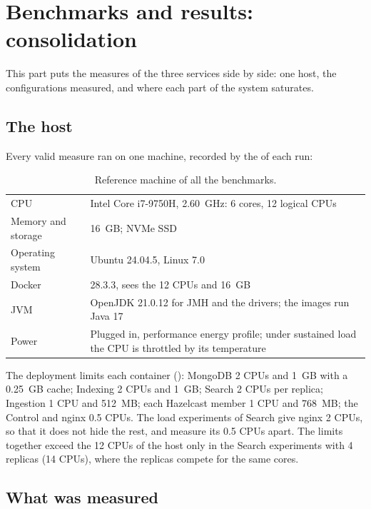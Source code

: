 \section{Benchmarks and results: consolidation}
\label{sec:consolidation}

This part puts the measures of the three services side by side: one host, the configurations measured, and where each
part of the system saturates.

\subsection{The host}

Every valid measure ran on one machine, recorded by the  of each run:

\begin{table}[H]
\centering\small
\begin{tabularx}{\linewidth}{@{}L{3.4cm}X@{}}
\toprule
CPU & Intel Core i7-9750H, 2.60~GHz: 6 cores, 12 logical CPUs \\
Memory and storage & 16~GB; NVMe SSD \\
Operating system & Ubuntu 24.04.5, Linux 7.0 \\
Docker & 28.3.3, sees the 12 CPUs and 16~GB \\
JVM & OpenJDK 21.0.12 for JMH and the drivers; the images run Java 17 \\
Power & Plugged in, performance energy profile; under sustained load the CPU is throttled by its temperature \\
\bottomrule
\end{tabularx}
\caption{Reference machine of all the benchmarks.}
\label{tab:host}
\end{table}

The deployment limits each container (): MongoDB 2 CPUs and 1~GB with a 0.25~GB cache; Indexing 2 CPUs and
1~GB; Search 2 CPUs per replica; Ingestion 1 CPU and 512~MB; each Hazelcast member 1 CPU and 768~MB; the Control and
nginx 0.5 CPUs. The load experiments of Search give nginx 2 CPUs, so that it does not hide the rest, and measure its
0.5 CPUs apart. The limits together exceed the 12 CPUs of the host only in the Search experiments with 4 replicas
(14 CPUs), where the replicas compete for the same cores.

\subsection{What was measured}

